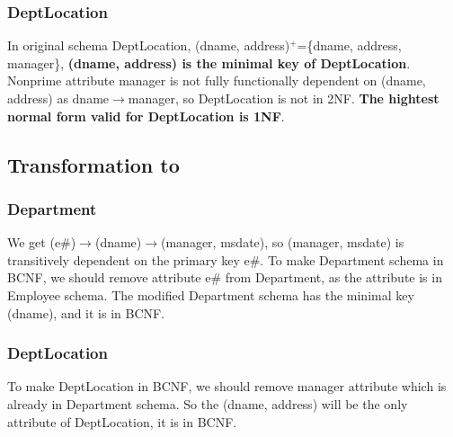 \documentclass[12pt]{article}%
\begin{document}
\subsubsection*{DeptLocation}
\noindent In original schema DeptLocation, (dname, address)$^+$=\{dname, address, manager\}, \textbf{(dname, address) is the minimal key of DeptLocation}. Nonprime attribute manager is not fully functionally dependent on (dname, address) as dname$\rightarrow$manager, so DeptLocation is not in 2NF. \textbf{The hightest normal form valid for DeptLocation is 1NF}. 

\subsection*{Transformation to}
\subsubsection*{Department}
We get (e\#)$\rightarrow$(dname)$\rightarrow$(manager, msdate), so (manager, msdate) is transitively dependent on the primary key e\#. To make Department schema in BCNF, we should remove attribute e\# from Department, as the attribute is in Employee schema. The modified Department schema has the minimal key (dname), and it is in BCNF.

\subsubsection*{DeptLocation}
To make DeptLocation in BCNF, we should remove manager attribute which is already in Department schema. So the (dname, address) will be the only attribute of DeptLocation, it is in BCNF. 
\clearpage
\end{document}
